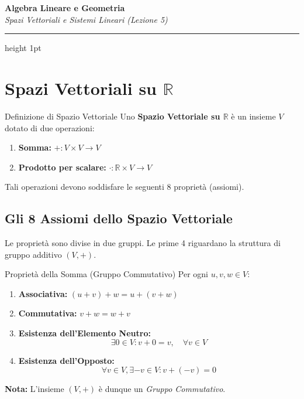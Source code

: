 
\begin{center}
    {\Huge \textbf{\color{cherryRed} Algebra Lineare e Geometria}} \\
    \vspace{0.5cm}
    {\Large \textit{Spazi Vettoriali e Sistemi Lineari (Lezione 5)}}
    \vspace{1cm}
    \hrule height 1pt
\end{center}

\section{Spazi Vettoriali su $\mathbb{R}$}

\begin{concept}{Definizione di Spazio Vettoriale}{}
Uno \textbf{Spazio Vettoriale su $\mathbb{R}$} è un insieme $V$ dotato di due operazioni:
\begin{enumerate}
    \item \textbf{Somma:} $+ : V \times V \longrightarrow V$
    \item \textbf{Prodotto per scalare:} $\cdot : \mathbb{R} \times V \longrightarrow V$
\end{enumerate}
Tali operazioni devono soddisfare le seguenti 8 proprietà (assiomi).
\end{concept}

\subsection{Gli 8 Assiomi dello Spazio Vettoriale}

Le proprietà sono divise in due gruppi. Le prime 4 riguardano la struttura di gruppo additivo $(V, +)$.

\begin{proposition}{Proprietà della Somma (Gruppo Commutativo)}{}
Per ogni $u, v, w \in V$:
\begin{enumerate}
    \item \textbf{Associativa:} $(u + v) + w = u + (v + w)$
    \item \textbf{Commutativa:} $v + w = w + v$
    \item \textbf{Esistenza dell'Elemento Neutro:}
    \[ \exists 0 \in V : v + 0 = v, \quad \forall v \in V \]
    \item \textbf{Esistenza dell'Opposto:}
    \[ \forall v \in V, \exists -v \in V : v + (-v) = 0 \]
\end{enumerate}
\textbf{Nota:} L'insieme $(V, +)$ è dunque un \textit{Gruppo Commutativo}.
\end{proposition}

